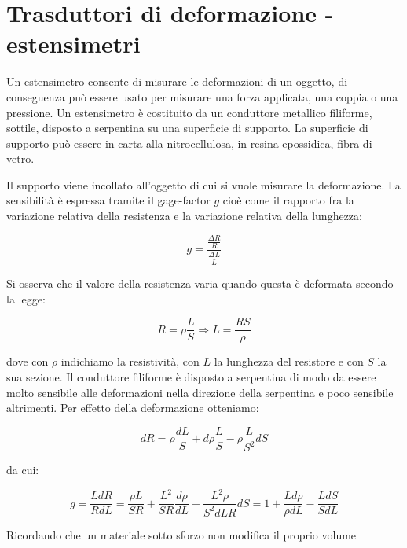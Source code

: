 \section{Trasduttori di deformazione - estensimetri}
Un estensimetro consente di misurare le deformazioni di un oggetto,
di conseguenza può essere usato per misurare una forza applicata, una
coppia o una pressione.
Un estensimetro è costituito da un conduttore metallico filiforme,
sottile, disposto a serpentina su una superficie di supporto. La
superficie di supporto può essere in carta alla nitrocellulosa, in
resina epossidica, fibra di vetro.


Il supporto viene incollato all'oggetto di cui si vuole misurare la
deformazione. La sensibilità è espressa tramite il gage-factor $g$
cioè come il rapporto fra la variazione relativa della resistenza e la
variazione relativa della lunghezza:

	\[g=\frac{\frac{\Delta R}{R}}{\frac{\Delta L}{L}}\]

Si osserva che il valore della resistenza varia quando questa è
deformata secondo la legge:

	\[R=\rho\frac{L}{S} \Rightarrow L =\frac{RS}{\rho}\]

dove con $\rho$ indichiamo la resistività, con $L$ la lunghezza del
resistore e con $S$ la sua sezione.
Il conduttore filiforme è disposto a serpentina di modo da essere
molto sensibile alle deformazioni nella direzione della serpentina e
poco sensibile altrimenti. Per effetto della deformazione otteniamo:

	\[dR=\rho\frac{dL}{S} + d\rho\frac{L}{S} -
	     \rho\frac{L}{S^2}dS\]

da cui:

	\[g=\frac{LdR}{RdL}=\frac{\rho L}{SR}+
			    \frac{L^2}{SR}\frac{d\rho}{dL}-
			    \frac{L^2\rho}{S^2dLR}dS
	   =1+\frac{Ld\rho}{\rho dL} - \frac{L dS}{S dL}\]

Ricordando che un materiale sotto sforzo non modifica il proprio
volume



